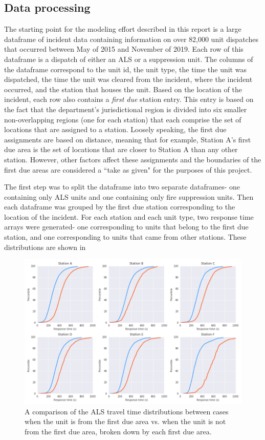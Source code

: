 \documentclass[article]{proc}
\begin{document}
\subsection{Data processing}
The starting point for the modeling effort described in this report is a large dataframe of incident data containing information on over 82,000 unit dispatches that occurred between May of 2015 and November of 2019. Each row of this dataframe is a dispatch of either an ALS or a suppression unit. The columns of the dataframe correspond to the unit id, the unit type, the time the unit was dispatched, the time the unit was cleared from the incident, where the incident occurred, and the station that houses the unit. Based on the location of the incident, each row also contains a \textit{first due} station entry. This entry is based on the fact that the department's jurisdictional region is divided into six smaller non-overlapping regions (one for each station) that each comprise the set of locations that are assigned to a station. Loosely speaking, the first due assignments are based on distance, meaning that for example, Station A's first due area is the set of locations that are closer to Station A than any other station. However, other factors affect these assignments and the boundaries of the first due areas are considered a ``take as given" for the purposes of this project.


The first step was to split the dataframe into two separate dataframes- one containing only ALS units and one containing only fire suppression units. Then each dataframe was grouped by the first due station corresponding to the location of the incident. For each station and each unit type, two response time arrays were generated- one corresponding to units that belong to the first due station, and one corresponding to units that came from other stations. These distributions are shown in


\begin{figure}[!htb]
  \centering
  \includegraphics[width=16cm,keepaspectratio]{Figures/alsdiff.png}
  \caption{A comparison of the ALS travel time distributions between cases when the unit is from the first due area vs. when the unit is not from the first due area, broken down by each first due area.}
  \label{fig:raw_signal}
\end{figure}
\end{document}
